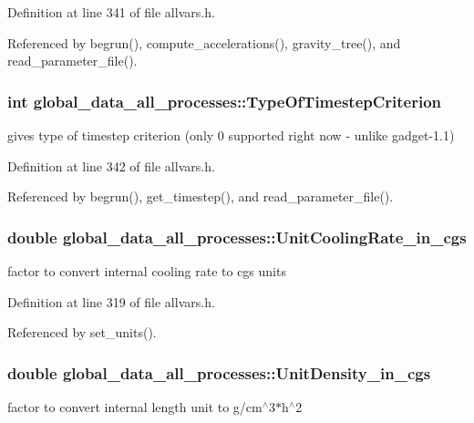 Definition at line 341 of file allvars.h.



Referenced by begrun(), compute\_\-accelerations(), gravity\_\-tree(), and read\_\-parameter\_\-file().

\hypertarget{structglobal__data__all__processes_a2cc704c49ada031fae9619dbf163e32d}{
\subsubsection[{TypeOfTimestepCriterion}]{\setlength{\rightskip}{0pt plus 5cm}int {\bf global\_\-data\_\-all\_\-processes::TypeOfTimestepCriterion}}}
\label{structglobal__data__all__processes_a2cc704c49ada031fae9619dbf163e32d}
gives type of timestep criterion (only 0 supported right now -\/ unlike gadget-\/1.1) 

Definition at line 342 of file allvars.h.



Referenced by begrun(), get\_\-timestep(), and read\_\-parameter\_\-file().

\hypertarget{structglobal__data__all__processes_a79739025eb7e66065966227036437e06}{
\subsubsection[{UnitCoolingRate\_\-in\_\-cgs}]{\setlength{\rightskip}{0pt plus 5cm}double {\bf global\_\-data\_\-all\_\-processes::UnitCoolingRate\_\-in\_\-cgs}}}
\label{structglobal__data__all__processes_a79739025eb7e66065966227036437e06}
factor to convert internal cooling rate to cgs units 

Definition at line 319 of file allvars.h.



Referenced by set\_\-units().

\hypertarget{structglobal__data__all__processes_aeccb92d371d0cfbd90cc34f85c8aa25f}{
\subsubsection[{UnitDensity\_\-in\_\-cgs}]{\setlength{\rightskip}{0pt plus 5cm}double {\bf global\_\-data\_\-all\_\-processes::UnitDensity\_\-in\_\-cgs}}}
\label{structglobal__data__all__processes_aeccb92d371d0cfbd90cc34f85c8aa25f}
factor to convert internal length unit to g/cm$^\wedge$3$\ast$h$^\wedge$2 

